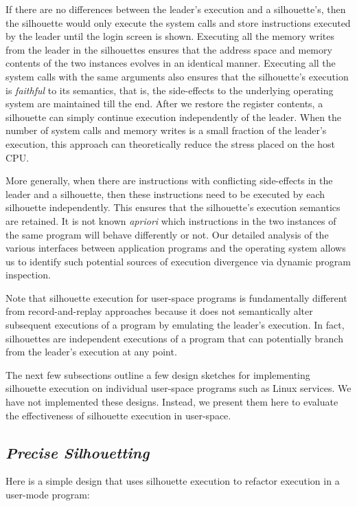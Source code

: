 If there are no differences between the leader's
execution and a silhouette's, then the silhouette would only
execute the system calls and store instructions
executed by the leader until the login screen is shown.
Executing all the memory writes from the leader
in the silhouettes ensures that the address space and memory
contents of the two instances
evolves in an identical manner. Executing all the system
calls with the same arguments also ensures
that the silhouette's execution is {\em faithful}
to its semantics, that is, the side-effects to the underlying
operating system are maintained till the end.
After we restore the register contents, a silhouette can simply continue
execution independently of the leader.
When the number of system calls and memory writes
is a small fraction of the leader's execution,
this approach can theoretically reduce the stress
placed on the host CPU. 

More generally, when there are instructions
with conflicting side-effects in the leader
and a silhouette, then these instructions
need to be executed by each silhouette independently.
This ensures that the silhouette's execution
semantics are retained. 
It is not known {\em apriori} which instructions in the
two instances of the same program will behave
differently or not.
Our detailed analysis of the various interfaces
between application programs and the operating system
allows us to identify such potential sources of
execution divergence via dynamic 
program inspection.

\newpage
Note that silhouette execution for user-space programs is fundamentally different
from record-and-replay approaches because it
does not semantically alter subsequent executions
of a program by emulating the leader's execution. 
In fact, silhouettes are independent executions of a program
that can potentially branch from the leader's execution at any point.

The next few subsections outline a few
design sketches for implementing silhouette execution
on individual user-space programs
such as Linux services.
We have not implemented these designs.
Instead, we present them here 
to evaluate the effectiveness of silhouette
execution in user-space.

\subsection{{\em Precise Silhouetting}}\label{precise:sil}
Here is a simple design that uses silhouette execution 
to refactor execution in a user-mode program:

